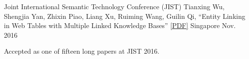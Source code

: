 

\begin{cventries}


  \cventry
    {Joint International Semantic Technology Conference (JIST)} %
    {Tianxing Wu, Shengjia Yan, Zhixin Piao, Liang Xu, Ruiming Wang, Guilin Qi, ``Entity Linking in Web Tables with Multiple Linked Knowledge Bases'' \href{http://yanshengjia.com/file/jist2016.pdf}{[\underline{PDF}]}} %
    {Singapore} %
    {Nov. 2016} %
    {
      \begin{cvitems} %
        \item {Accepted as one of fifteen long papers at JIST 2016.}
      \end{cvitems}
    }



\end{cventries}
